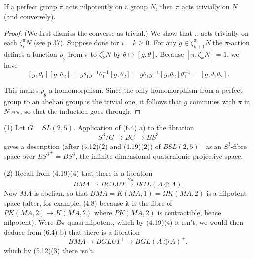 \begin{prop}
 	If a perfect group $\pi$ acts nilpotently on a group $N$, then $\pi$ acts trivially on $N$ (and conversely).
 \end{prop} 
\begin{proof}
 (We first dismiss the converse as trivial.) We show that $\pi$ acts trivially on each $\zeta_i^\pi N$ (see p.37). Suppose done for $i = k \geqslant 0$. For any $g\in \zeta_{k+1}^\pi N$ the $\pi$-action defines a function $\rho_g$ from $\pi$ to $\zeta_{k}^\pi N$ by $\theta \mapsto [g, \theta ]$. Because $[\pi,\zeta_{k}^\pi N ]= 1$, we have
 \[[g,\theta_1][g,\theta_2] =g\theta_1g^{-1}\theta_1^{-1}[g,\theta_2]=g\theta_1g^{-1}[g,\theta_2]\theta_1^{-1}=[g,\theta_1 \theta_2].\]

This makes $\rho_g$ a homomorphism. Since the only homomorphism from a perfect group to an abelian group is the trivial one, it follows that $g$ commutes with $\pi$ in $N \rtimes \pi$, so that the induction goes through.
 \end{proof}
  \begin{ex}
  	(1) Let $G = SL(2, 5)$. Application of (6.4) a) to the fibration 
\[S^3/G \rightarrow BG \rightarrow BS^3\]
gives a description (after (5.12)(2) and (4.19)(2)) of $BSL(2, 5)^+$ as an $S^3$-fibre space over ${BS^3}^+ = BS^3$, the infinite-dimensional quaternionic projective space. 

(2) Recall from (4.19)(4) that there is a fibration
\[BMA \longrightarrow BGLUT \overset{B\pi}{\longrightarrow}  BGL(A\oplus A).\]
Now $MA$ is abelian, so that $BMA = K(MA, 1) = \Omega K(MA, 2)$ is a nilpotent space (after, for example, (4.8) because it is the fibre of $PK(MA, 2) \longrightarrow K(MA, 2)$ where $PK(MA, 2)$ is contractible, hence nilpotent). Were $B\pi$ quasi-nilpotent, which by (4.19)(4) it isn't, we would then deduce from (6.4) b) that there is a fibration
\[BMA \longrightarrow BGLUT^+ \longrightarrow  BGL(A\oplus A)^+,\]
which by (5.12)(3) there isn't.
  \end{ex}

